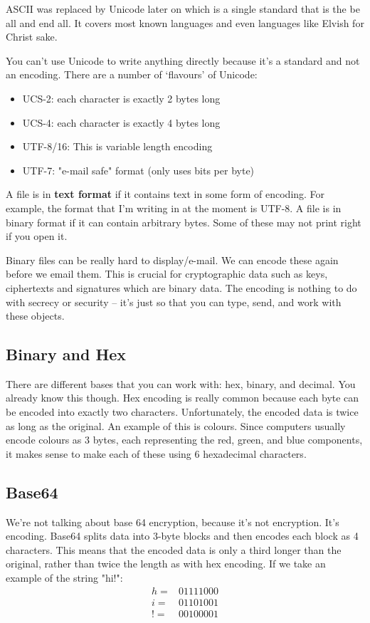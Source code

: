\documentclass[11pt,a4paper,titlepage]{scrartcl}
\begin{document}
ASCII was replaced by Unicode later on which is a single standard that is
the be all and end all. It covers most known languages and even languages
like Elvish for Christ sake.

You can't use Unicode to write anything directly because it's a standard
and not an encoding. There are a number of `flavours' of Unicode:
\begin{itemize}
    \item UCS-2: each character is exactly 2 bytes long
    \item UCS-4: each character is exactly 4 bytes long
    \item UTF-8/16: This is variable length encoding
    \item UTF-7: "e-mail safe" format (only uses bits per byte)
\end{itemize}

A file is in \textbf{text format} if it contains text in some form of
encoding. For example, the format that I'm writing in at the moment is
UTF-8. A file is in binary format if it can contain arbitrary bytes. Some
of these may not print right if you open it. 

Binary files can be really hard to display/e-mail. We can encode these
again before we email them. This is crucial for cryptographic data such as
keys, ciphertexts and signatures which are binary data. The encoding is
nothing to do with secrecy or security -- it's just so that you can type,
send, and work with these objects.

\subsection{Binary and Hex}%
\label{sub:Binary}

There are different bases that you can work with: hex, binary, and
decimal. You already know this though. Hex encoding is really common
because each byte can be encoded into exactly two characters.
Unfortunately, the encoded data is twice as long as the original. An
example of this is colours. Since computers usually encode colours as 3
bytes, each representing the red, green, and blue components, it makes
sense to make each of these using 6 hexadecimal characters. 

\subsection{Base64}%
\label{sub:Base64}
We're not talking about base 64 encryption, because it's not encryption.
It's encoding. Base64 splits data into 3-byte blocks and then encodes each
block as 4 characters. This means that the encoded data is only a third
longer than the original, rather than twice the length as with hex
encoding. If we take an example of the string "hi!":
\begin{align*}
    h = &0111 1000 \\
    i = &0110 1001 \\
    ! = &0010 0001
\end{align*}
\end{document}
